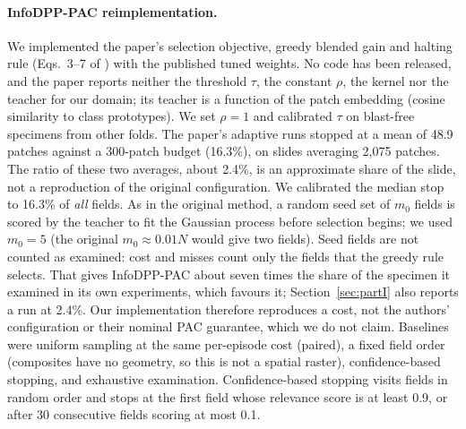 \documentclass[11pt]{article}
\theoremstyle{remark}
\theoremstyle{definition}
\begin{document}
\paragraph{InfoDPP-PAC reimplementation.} We implemented the paper's selection objective, greedy blended gain and halting rule (Eqs.~3--7 of \cite{mittal2026infodpp}) with the published tuned weights. No code has been released, and the paper reports neither the threshold $\tau$, the constant $\rho$, the kernel nor the teacher for our domain; its teacher is a function of the patch embedding (cosine similarity to class prototypes). We set $\rho=1$ and calibrated $\tau$ on blast-free specimens from other folds. The paper's adaptive runs stopped at a mean of 48.9 patches against a 300-patch budget (16.3\%), on slides averaging 2,075 patches. The ratio of these two averages, about 2.4\%, is an approximate share of the slide, not a reproduction of the original configuration. We calibrated the median stop to 16.3\% of \emph{all} fields. As in the original method, a random seed set of $m_0$ fields is scored by the teacher to fit the Gaussian process before selection begins; we used $m_0=5$ (the original $m_0\approx0.01N$ would give two fields). Seed fields are not counted as examined: cost and misses count only the fields that the greedy rule selects. That gives InfoDPP-PAC about seven times the share of the specimen it examined in its own experiments, which favours it; Section~\ref{sec:partI} also reports a run at 2.4\%. Our implementation therefore reproduces a cost, not the authors' configuration or their nominal PAC guarantee, which we do not claim. Baselines were uniform sampling at the same per-episode cost (paired), a fixed field order (composites have no geometry, so this is not a spatial raster), confidence-based stopping, and exhaustive examination. Confidence-based stopping visits fields in random order and stops at the first field whose relevance score is at least 0.9, or after 30 consecutive fields scoring at most 0.1.
\end{document}
